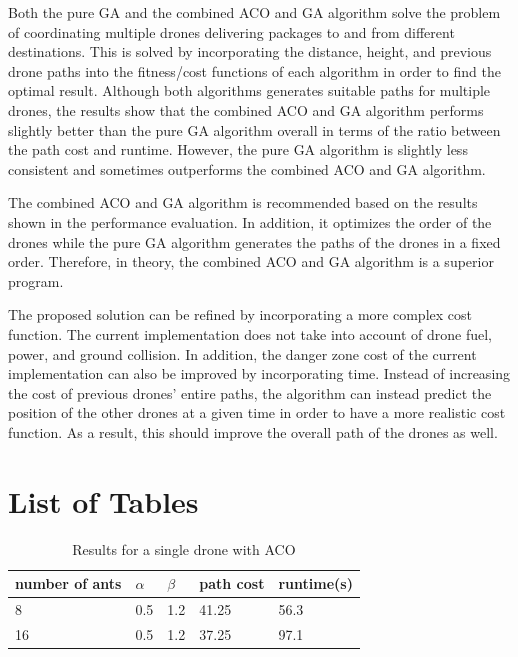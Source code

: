 \documentclass[conference]{IEEEtran}
\begin{document}
Both the pure GA and the combined ACO and GA algorithm solve the problem of coordinating multiple drones delivering packages to and from different destinations. This is solved by incorporating the distance, height, and previous drone paths into the fitness/cost functions of each algorithm in order to find the optimal result. Although both algorithms generates suitable paths for multiple drones, the results show that the combined ACO and GA algorithm performs slightly better than the pure GA algorithm overall in terms of the ratio between the path cost and runtime. However, the pure GA algorithm is slightly less consistent and sometimes outperforms the combined ACO and GA algorithm.

The combined ACO and GA algorithm is recommended based on the results shown in the performance evaluation. In addition, it optimizes the order of the drones while the pure GA algorithm generates the paths of the drones in a fixed order. Therefore, in theory, the combined ACO and GA algorithm is a superior program.

The proposed solution can be refined by incorporating a more complex cost function. The current implementation does not take into account of drone fuel, power, and ground collision. In addition, the danger zone cost of the current implementation can also be improved by incorporating time. Instead of increasing the cost of previous drones' entire paths, the algorithm can instead predict the position of the other drones at a given time in order to have a more realistic cost function. As a result, this should improve the overall path of the drones as well.

\newpage

\section{List of Tables}
\begin{table}[H]
\centering
\begin{tabular}{ | m{1cm} | m{1cm}| m{1cm} | m{1.5cm} | m{1.5cm} |} 
\hline
number of ants & $\alpha$ & $\beta$ & path cost & runtime(s) \\ 
\hline
8 & 0.5 & 1.2 & 41.25 & 56.3 \\
\hline
16 & 0.5 & 1.2 & 37.25 & 97.1 \\ 
\hline
\end{tabular}
\caption{Results for a single drone with ACO} \label{tab:single_aco}
\end{table}
\end{document}
